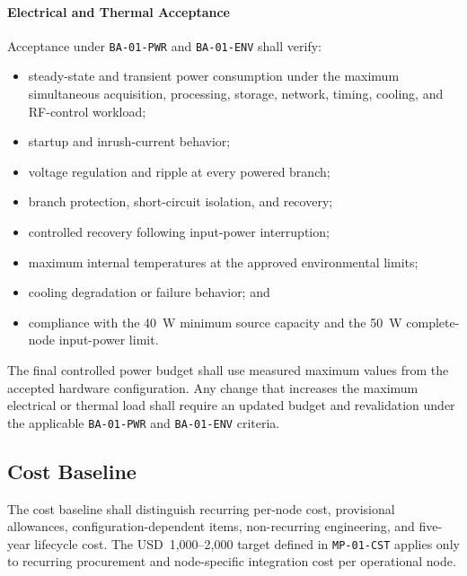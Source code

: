 \documentclass[11pt,a4paper]{article}
\begin{document}
	\paragraph*{Electrical and Thermal Acceptance}
	
	Acceptance under \texttt{BA-01-PWR} and \texttt{BA-01-ENV} shall verify:
	
	\begin{itemize}[leftmargin=*]
		\item steady-state and transient power consumption under the maximum
		simultaneous acquisition, processing, storage, network, timing, cooling,
		and RF-control workload;
		\item startup and inrush-current behavior;
		\item voltage regulation and ripple at every powered branch;
		\item branch protection, short-circuit isolation, and recovery;
		\item controlled recovery following input-power interruption;
		\item maximum internal temperatures at the approved environmental limits;
		\item cooling degradation or failure behavior; and
		\item compliance with the 40~W minimum source capacity and the 50~W
		complete-node input-power limit.
	\end{itemize}
	
	The final controlled power budget shall use measured maximum values from the
	accepted hardware configuration. Any change that increases the maximum
	electrical or thermal load shall require an updated budget and revalidation
	under the applicable \texttt{BA-01-PWR} and \texttt{BA-01-ENV} criteria.
	
	\subsection*{Cost Baseline}
	
	The cost baseline shall distinguish recurring per-node cost, provisional
	allowances, configuration-dependent items, non-recurring engineering, and
	five-year lifecycle cost. The USD~1,000--2,000 target defined in
	\texttt{MP-01-CST} applies only to recurring procurement and node-specific
	integration cost per operational node.
	
\end{document}
